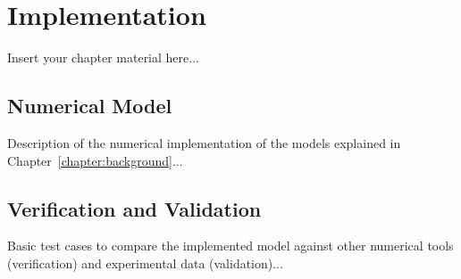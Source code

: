 
\chapter{Implementation}
\label{chapter:implementation}

Insert your chapter material here...

\section{Numerical Model}
\label{section:model}

Description of the numerical implementation of the models explained in Chapter~\ref{chapter:background}...


\section{Verification and Validation}
\label{section:verification}

Basic test cases to compare the implemented model against other numerical tools (verification) and experimental data (validation)...


